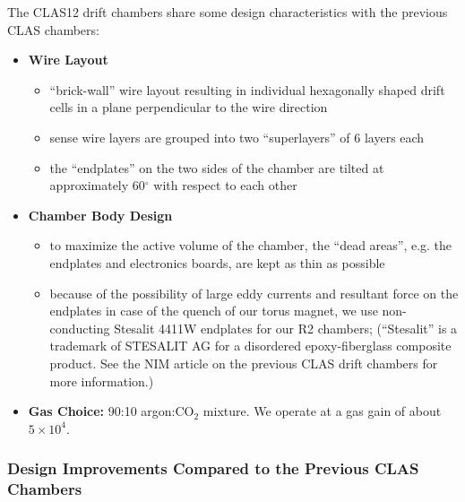 The CLAS12 drift chambers share some design characteristics with the previous CLAS chambers:
\begin{itemize}
\item {\bf Wire Layout}
\begin{itemize}
\item ``brick-wall'' wire layout resulting in individual hexagonally shaped
drift cells in a plane perpendicular to the wire direction
\item sense wire layers are grouped into two ``superlayers'' of 6 layers each
\item the ``endplates'' on the two sides of the chamber are tilted 
at approximately 60$^\circ$ with respect to each other
\end{itemize}
\item {\bf Chamber Body Design}
\begin{itemize}
\item to maximize the active volume of the chamber, the ``dead areas'', e.g.
the endplates and electronics boards, are kept as thin as possible
\item because of the possibility of large eddy currents and resultant
force on the endplates in case of the quench of our torus magnet, we
use non-conducting Stesalit 4411W endplates for our R2 chambers; (``Stesalit'' is 
a trademark of STESALIT AG for a disordered epoxy-fiberglass composite product.  See
the NIM article \cite{dcnim} on the previous CLAS drift chambers for more information.)
\end{itemize}
\item {\bf Gas Choice:} 90:10 argon:CO$_2$ mixture.  We operate at a gas gain of 
about $5 \times 10^4$.
\end{itemize}

\subsubsection{Design Improvements Compared to the Previous CLAS Chambers}

